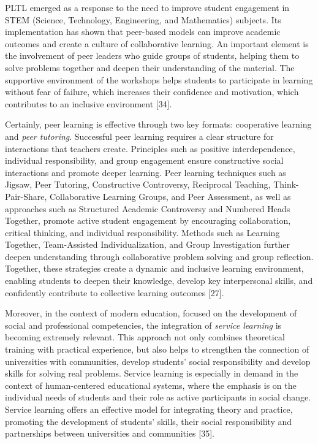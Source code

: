 PLTL emerged as a response to the need to improve student engagement in
STEM (Science, Technology, Engineering, and Mathematics) subjects. Its
implementation has shown that peer-based models can improve academic
outcomes and create a culture of collaborative learning. An important
element is the involvement of peer leaders who guide groups of students,
helping them to solve problems together and deepen their understanding
of the material. The supportive environment of the workshops helps
students to participate in learning without fear of failure, which
increases their confidence and motivation, which contributes to an
inclusive environment {[}34{]}.

Certainly, peer learning is effective through two key formats:
cooperative learning and \emph{peer tutoring}. Successful peer learning
requires a clear structure for interactions that teachers create.
Principles such as positive interdependence, individual responsibility,
and group engagement ensure constructive social interactions and promote
deeper learning. Peer learning techniques such as Jigsaw, Peer Tutoring,
Constructive Controversy, Reciprocal Teaching, Think-Pair-Share,
Collaborative Learning Groups, and Peer Assessment, as well as
approaches such as Structured Academic Controversy and Numbered Heads
Together, promote active student engagement by encouraging
collaboration, critical thinking, and individual responsibility. Methods
such as Learning Together, Team-Assisted Individualization, and Group
Investigation further deepen understanding through collaborative problem
solving and group reflection. Together, these strategies create a
dynamic and inclusive learning environment, enabling students to deepen
their knowledge, develop key interpersonal skills, and confidently
contribute to collective learning outcomes {[}27{]}.

Moreover, in the context of modern education, focused on the development
of social and professional competencies, the integration of
\emph{service learning} is becoming extremely relevant. This approach
not only combines theoretical training with practical experience, but
also helps to strengthen the connection of universities with
communities, develop students'{} social responsibility
and develop skills for solving real problems. Service learning is
especially in demand in the context of human-centered educational
systems, where the emphasis is on the individual needs of students and
their role as active participants in social change. Service learning
offers an effective model for integrating theory and practice, promoting
the development of students'{} skills, their social
responsibility and partnerships between universities and communities
{[}35{]}.


